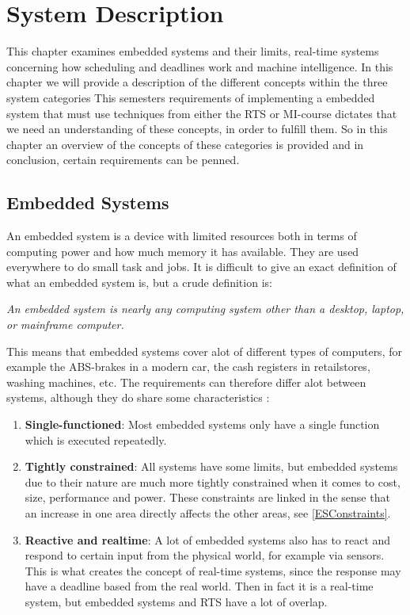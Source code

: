 \chapter{System Description}
This chapter examines embedded systems and their limits,
real-time systems concerning how scheduling and deadlines work and machine
intelligence.
In this chapter we will provide a description of the different concepts within the
three system categories
This semesters requirements of implementing a embedded system that must use techniques
from either the RTS or MI-course dictates that we need an understanding of these concepts,
in order to fulfill them. So in this chapter an overview of the concepts of these categories
is provided and in conclusion, certain requirements can be penned.



\section{Embedded Systems}
An embedded system is a device with limited resources both in terms of computing
power and how much memory it has available. They are used everywhere to do small task and
jobs. It is difficult to give an exact definition of what an embedded system is,
but a crude definition\citep[ch.1.1]{vahid1999embedded} is:\nl

\textit{An  embedded  system  is  nearly  any computing system other than a desktop,
laptop, or  mainframe  computer.}\nl

This means that embedded systems cover alot of different types of computers, for example
the ABS-brakes in a modern car, the cash registers in retailstores, washing machines, etc.
The requirements can therefore differ alot between systems, although they do
share some characteristics \Source:

\begin{enumerate}
  \item \textbf{Single-functioned}:  Most embedded systems only have a single
  function which is executed repeatedly.
  \item \textbf{Tightly constrained}: All systems have some limits, but embedded
  systems due to their nature are much more tightly constrained when it comes to
  cost, size, performance and power. These constraints are linked in the sense
  that an increase in one area directly affects the other areas, see
  \autoref{ESConstraints}.
  \item \textbf{Reactive and realtime}: A lot of embedded systems also has to
  react and respond to certain input from the physical world, for example via sensors.
  This is what creates the concept of real-time systems, since the response may have a deadline
  based from the real world. Then in fact it is a real-time system, but embedded systems and
  RTS have a lot of overlap.
\end{enumerate}


